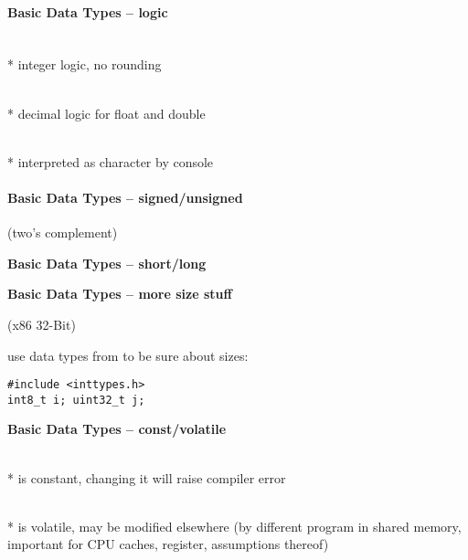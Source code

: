 \paragraph{Basic Data Types -- logic}
\begin{items}
  \item {} \\*
    integer logic, no rounding
  \item {} \\*
    decimal logic for float and double
  \item {} \\*
     interpreted as character by console
\end{items}

\paragraph{Basic Data Types -- signed/unsigned}
\begin{items}
  \item {} (two's complement)
  \item {}
\end{items}

\textbf{Basic Data Types -- short/long}
\begin{items}
  \item {}
  \item {}
\end{items}

\textbf{Basic Data Types -- more size stuff}
\begin{items}
  \item {} (x86 32-Bit)
  \item use data types from  to be sure about sizes:
  \begin{lstlisting}[style=customc]
#include <inttypes.h>
int8_t i; uint32_t j;
  \end{lstlisting}
\end{items}

\textbf{Basic Data Types -- const/volatile}
\begin{items}
  \item {} \\*
     is constant, changing it will raise compiler error
  \item {} \\*
     is volatile, may be modified elsewhere (by different program in shared memory, important for CPU caches, register, assumptions thereof)
\end{items}

